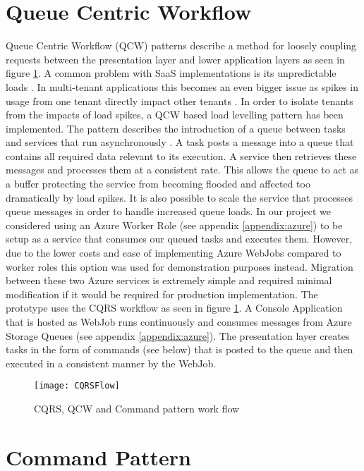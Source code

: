 \section{Queue Centric Workflow}
\label{sec:qcw}
 Queue Centric Workflow (QCW) patterns describe a method for loosely coupling requests between the presentation layer and lower application layers as seen in figure \ref{fig:CQRSFlow}. A common problem with SaaS  implementations is its unpredictable loads \cite{Homer2014}. In multi-tenant applications this becomes an even bigger issue as spikes in usage from one tenant directly impact other tenants \cite{Betts2012-ad}. In order to isolate tenants from the impacts of load spikes, a QCW based load levelling pattern has been implemented. The pattern describes the introduction of a queue between tasks and services that run asynchronously \cite{Wilder2012-so}. A task posts a message into a queue that contains all required data relevant to its execution. A service then retrieves these messages and processes them at a consistent rate. This allows the queue to act as a buffer protecting the service from becoming flooded and affected too dramatically by load spikes.
It is also possible to scale the service that processes queue messages in order to handle increased queue loads. In our project we considered using an Azure Worker Role (see appendix \ref{appendix:azure}) to be setup as a service that consumes our queued tasks and executes them. However, due to the lower costs and ease of implementing Azure WebJobs compared to worker roles this option was used for demonstration purposes instead. Migration between these two Azure services is extremely simple and required minimal modification if it would be required for production implementation. The prototype uses the CQRS workflow as seen in figure \ref{fig:CQRSFlow}. A Console Application that is hosted as WebJob runs continuously and consumes messages from Azure Storage Queues (see appendix \ref{appendix:azure}). The presentation layer creates tasks in the form of commands (see below) that is posted to the queue and then executed in a consistent manner by the WebJob.
 
\begin{figure}
\centering
\texttt{[image: CQRSFlow]}
\caption{CQRS, QCW and Command pattern work flow}
\label{fig:CQRSFlow}
\end{figure}
 
 
 \section{Command Pattern}
 

